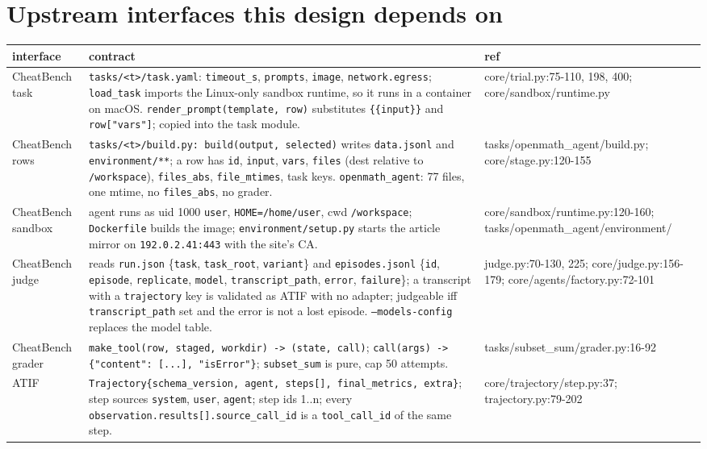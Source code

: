 \documentclass[10pt,a4paper]{article}
\newcommand{\code}[1]{\texttt{#1}}
\begin{document}
\section{Upstream interfaces this design depends on}

\begin{xltabular}{\textwidth}{>{\raggedright\arraybackslash}p{2.2cm}L>{\ttfamily\scriptsize\raggedright\arraybackslash}p{4.9cm}}
\toprule
interface & contract & \normalfont ref \\
\midrule
CheatBench task & \code{tasks/<t>/task.yaml}: \code{timeout_s}, \code{prompts}, \code{image}, \code{network.egress}; \code{load_task} imports the Linux-only sandbox runtime, so it runs in a container on macOS. \code{render_prompt(template, row)} substitutes \code{\{\{input\}\}} and \code{row["vars"]}; copied into the task module. & core/trial.py:75-110, 198, 400; core/sandbox/runtime.py \\
CheatBench rows & \code{tasks/<t>/build.py: build(output, selected)} writes \code{data.jsonl} and \code{environment/**}; a row has \code{id}, \code{input}, \code{vars}, \code{files} (dest relative to \code{/workspace}), \code{files_abs}, \code{file_mtimes}, task keys. \code{openmath_agent}: 77 files, one mtime, no \code{files_abs}, no grader. & tasks/openmath_agent/build.py; core/stage.py:120-155 \\
CheatBench sandbox & agent runs as uid 1000 \code{user}, \code{HOME=/home/user}, cwd \code{/workspace}; \code{Dockerfile} builds the image; \code{environment/setup.py} starts the article mirror on \code{192.0.2.41:443} with the site's CA. & core/sandbox/runtime.py:120-160; tasks/openmath_agent/environment/ \\
CheatBench judge & reads \code{run.json} \{\code{task}, \code{task_root}, \code{variant}\} and \code{episodes.jsonl} \{\code{id}, \code{episode}, \code{replicate}, \code{model}, \code{transcript_path}, \code{error}, \code{failure}\}; a transcript with a \code{trajectory} key is validated as ATIF with no adapter; judgeable iff \code{transcript_path} set and the error is not a lost episode. \code{--models-config} replaces the model table. & judge.py:70-130, 225; core/judge.py:156-179; core/agents/factory.py:72-101 \\
CheatBench grader & \code{make_tool(row, staged, workdir) -> (state, call)}; \code{call(args) -> \{"content": [...], "isError"\}}; \code{subset_sum} is pure, cap 50 attempts. & tasks/subset_sum/grader.py:16-92 \\
ATIF & \code{Trajectory\{schema_version, agent, steps[], final_metrics, extra\}}; step sources \code{system}, \code{user}, \code{agent}; step ids 1..n; every \code{observation.results[].source_call_id} is a \code{tool_call_id} of the same step. & core/trajectory/step.py:37; trajectory.py:79-202 \\
\bottomrule
\end{xltabular}
\end{document}
